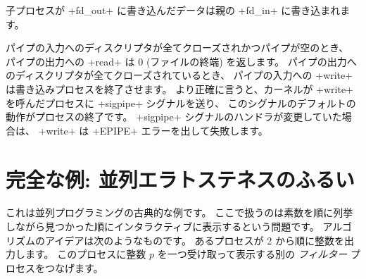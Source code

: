 \begin{example}
%
\begin{myimage}[width="45\%"]
\end{myimage}
%
子プロセスが \ml+fd_out+ に書き込んだデータは親の \ml+fd_in+ に書き込まれます。
\end{example}
パイプの入力へのディスクリプタが全てクローズされかつパイプが空のとき、
パイプの出力への \ml+read+ は 0 (ファイルの終端) を返します。
パイプの出力へのディスクリプタが全てクローズされているとき、
パイプの入力への \ml+write+ は書き込みプロセスを終了させます。
より正確に言うと、カーネルが \ml+write+ を呼んだプロセスに \ml+sigpipe+ シグナルを送り、
このシグナルのデフォルトの動作がプロセスの終了です。
\ml+sigpipe+ シグナルのハンドラが変更していた場合は、 \ml+write+ は \ml+EPIPE+ エラーを出して失敗します。

\section{\label{ex/crible}完全な例: 並列エラトステネスのふるい}

これは並列プログラミングの古典的な例です。
ここで扱うのは素数を順に列挙しながら見つかった順にインタラクティブに表示するという問題です。
アルゴリズムのアイデアは次のようなものです。
あるプロセスが 2 から順に整数を出力します。
このプロセスに整数 $p$ を一つ受け取って表示する別の \emph{フィルター} プロセスをつなげます。

